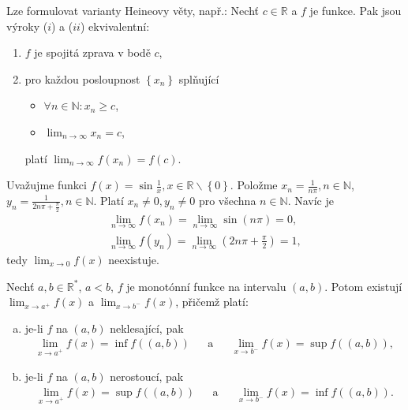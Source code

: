 \begin{poznamka}
	Lze formulovat varianty Heineovy věty, např.: Nechť $c\in \mathbb R $ a $f$ je funkce.
	Pak jsou výroky ($i$) a ($ii$) ekvivalentní:
	\begin{enumerate}[($i$)]
		\item $f$ je spojitá zprava v bodě $c$,
		\item pro každou posloupnost $\left \{ x_n \right \} $ splňující
		\begin{itemize}
			\item $\forall n \in \mathbb N : x_n \geq c$,
			\item $\lim_{n \to \infty} x_n = c$,
		\end{itemize}
		platí $\lim_{n \to \infty} f(x_n)=f(c)$.
	\end{enumerate}
\end{poznamka}

\begin{priklad}
	Uvažujme funkci $f(x)=\sin \frac{1}{x}, x \in \mathbb R \smallsetminus \left \{ 0 \right \} $.
	Položme $x_n=\frac{1}{n\pi},n\in \mathbb N $, $y_n = \frac{1}{2n\pi + \frac{\pi}{2}}, n \in \mathbb N $.
	Platí $x_n \ne 0, y_n \ne 0$ pro všechna $n \in \mathbb N $. Navíc je
	\begin{align*}
		\lim_{n \to \infty} f(x_n)=\lim_{n \to \infty} \sin(n\pi)=0, \\
		\lim_{n \to \infty} f(y_n) = \lim_{n \to \infty} \left( 2n\pi + \frac{\pi}{2} \right ) =1,
\end{align*}
tedy $\lim_{x \to 0} f(x)$ neexistuje.
\end{priklad}

\begin{veta}\label{veta3.9}
Nechť $a,b\in \mathbb R ^*$, $a<b$, $f$ je monotónní funkce na intervalu $(a,b)$. Potom existují $\lim_{x\to a^+} f(x)$ a $\lim_{x\to b^-} f(x)$, přičemž platí:
\begin{enumerate}[(a)]
  \item je-li $f$ na $(a,b)$ neklesající, pak
  \begin{align*}
	\lim_{x\to a^+} f(x)=\inf f((a,b)) && \textrm{a} & & \lim_{x\to b^-} f(x)=\sup f((a,b)),
  \end{align*}
  \item je-li $f$ na $(a,b)$ nerostoucí, pak
  \begin{align*}
	\lim_{x\to a^+} f(x)=\sup f((a,b)) && \textrm{a} & & \displaystyle \lim_{x\to b^-} f(x)=\inf f((a,b)).
  \end{align*}
\end{enumerate}
\end{veta}

